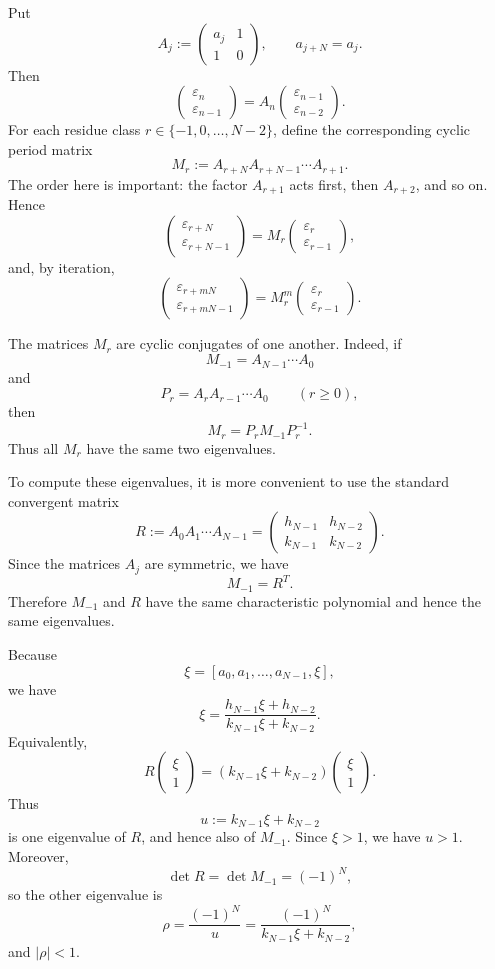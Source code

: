 \documentclass[]{interact}
\theoremstyle{plain}
\numberwithin{equation}{section} %
\numberwithin{table}{section} %
\numberwithin{figure}{section}
\begin{document}
Put
\[
A_j:=
\begin{pmatrix}
a_j&1\\
1&0
\end{pmatrix},
\qquad a_{j+N}=a_j.
\]
Then
\[
\begin{pmatrix}
\varepsilon_n\\
\varepsilon_{n-1}
\end{pmatrix}
=
A_n
\begin{pmatrix}
\varepsilon_{n-1}\\
\varepsilon_{n-2}
\end{pmatrix}.
\]
For each residue class \(r\in\{-1,0,\dots,N-2\}\), define the corresponding
cyclic period matrix
\[
M_r:=A_{r+N}A_{r+N-1}\cdots A_{r+1}.
\]
The order here is important: the factor \(A_{r+1}\) acts first, then
\(A_{r+2}\), and so on. Hence
\[
\begin{pmatrix}
\varepsilon_{r+N}\\
\varepsilon_{r+N-1}
\end{pmatrix}
=
M_r
\begin{pmatrix}
\varepsilon_r\\
\varepsilon_{r-1}
\end{pmatrix},
\]
and, by iteration,
\[
\begin{pmatrix}
\varepsilon_{r+mN}\\
\varepsilon_{r+mN-1}
\end{pmatrix}
=
M_r^m
\begin{pmatrix}
\varepsilon_r\\
\varepsilon_{r-1}
\end{pmatrix}.
\]

The matrices \(M_r\) are cyclic conjugates of one another. Indeed, if
\[
M_{-1}=A_{N-1}\cdots A_0
\]
and
\[
P_r=A_rA_{r-1}\cdots A_0
\qquad (r\ge0),
\]
then
\[
M_r=P_rM_{-1}P_r^{-1}.
\]
Thus all \(M_r\) have the same two eigenvalues.

To compute these eigenvalues, it is more convenient to use the standard
convergent matrix
\[
R:=A_0A_1\cdots A_{N-1}
=
\begin{pmatrix}
h_{N-1}&h_{N-2}\\
k_{N-1}&k_{N-2}
\end{pmatrix}.
\]
Since the matrices \(A_j\) are symmetric, we have
\[
M_{-1}=R^T.
\]
Therefore \(M_{-1}\) and \(R\) have the same characteristic polynomial and hence
the same eigenvalues.

Because
\[
\xi=[a_0,a_1,\dots,a_{N-1},\xi],
\]
we have
\[
\xi=\frac{h_{N-1}\xi+h_{N-2}}{k_{N-1}\xi+k_{N-2}}.
\]
Equivalently,
\[
R
\begin{pmatrix}
\xi\\
1
\end{pmatrix}
=
(k_{N-1}\xi+k_{N-2})
\begin{pmatrix}
\xi\\
1
\end{pmatrix}.
\]
Thus
\[
u:=k_{N-1}\xi+k_{N-2}
\]
is one eigenvalue of \(R\), and hence also of \(M_{-1}\). Since \(\xi>1\),
we have \(u>1\). Moreover,
\[
\det R=\det M_{-1}=(-1)^N,
\]
so the other eigenvalue is
\[
\rho=\frac{(-1)^N}{u}
=
\frac{(-1)^N}{k_{N-1}\xi+k_{N-2}},
\]
and \(|\rho|<1\).
\end{document}
